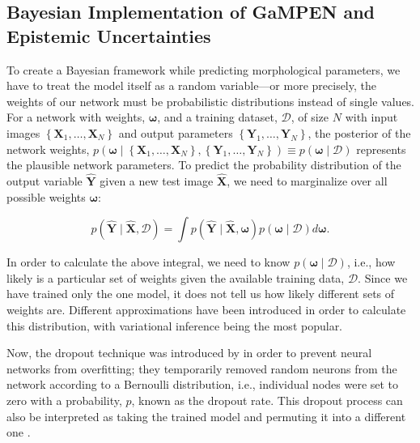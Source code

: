 \documentclass[twocolumn]{aastex63}
\newcommand\gampen{GaMPEN}
\begin{document}
\begin{CJK*}{UTF8}{gbsn}
\subsection{Bayesian Implementation of \gampen{} and Epistemic Uncertainties} \label{subsec:mcd}
To create a Bayesian framework while predicting morphological parameters, we have to treat the model itself as a random variable---or more precisely, the weights of our network %
must be probabilistic distributions instead of single
values. For a network with weights, $\boldsymbol{\omega}$, and a training dataset, $\mathcal{D}$, of size $N$ with input images $\left\{\boldsymbol{X}_{1}, \ldots, \boldsymbol{X}_{N}\right\}$ and output parameters $\left\{\boldsymbol{Y}_{1}, \ldots, \boldsymbol{Y}_{N}\right\}$, the posterior of the network weights, $p(\boldsymbol{\omega} \mid \left\{\boldsymbol{X}_{1}, \ldots, \boldsymbol{X}_{N}\right\}, \left\{\boldsymbol{Y}_{1}, \ldots, \boldsymbol{Y}_{N}\right\}) \equiv p(\boldsymbol{\omega} \mid \mathcal{D}) $ represents the plausible network parameters. To predict the probability distribution of the output variable $\boldsymbol{\hat{Y}}$ given a new test image $\boldsymbol{\hat{X}}$, we need to marginalize over all possible weights $\boldsymbol{\omega}$:

\begin{equation}
p(\boldsymbol{\hat{Y}} \mid \boldsymbol{\hat{X}}, \mathcal{D})=\int p(\boldsymbol{\hat{Y}} \mid \boldsymbol{\hat{X}}, \boldsymbol{\omega}) p(\boldsymbol{\omega} \mid \mathcal{D}) d \boldsymbol{\omega} .
\label{eq:out_y_pred}
\end{equation}

In order to calculate the above integral, we need to know $p(\boldsymbol{\omega}\mid\mathcal{D})$, i.e., how likely is a particular set of weights given the available training data, $\mathcal{D}$. Since we have trained only the one model, it does not tell us how likely different sets of weights are. Different approximations have been introduced in order to calculate this distribution, with variational inference \citep{Jordan1999IntroductionModels} being the most popular.

Now, the dropout technique was introduced by \cite{Srivastava2014Dropout:Overfitting} in order to prevent neural networks from overfitting; they temporarily removed random neurons from the network according to a Bernoulli distribution, i.e., individual nodes were set to zero with a probability, $p$, known as the dropout rate. This dropout process can also be interpreted as taking the trained model and permuting it into a different one \citep{Srivastava2014Dropout:Overfitting}.


\end{CJK*}
\end{document}
